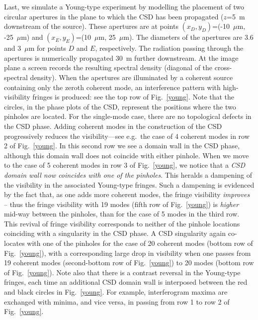 \documentclass[%
 reprint,
 amsmath,amssymb,
 aps,
]{revtex4-1}
\begin{document}
Last, we  simulate a Young-type experiment by modelling the placement of two circular apertures in the plane to which the CSD has been propagated ($z$=5~m downstream of the source). These apertures are at points $(x_D,y_D)$=(-10~$\mu$m, -25~$\mu$m) and  $(x_E,y_E)$=(10~$\mu$m, 25~$\mu$m). The diameters of the apertures are 3.6 and 3~$\mu$m for points $D$ and $E$, respectively. The radiation passing through the apertures is numerically propagated 30~m further downstream. At the image plane a screen records the resulting spectral density (diagonal of the cross-spectral density). When the apertures are illuminated by a coherent source containing only the zeroth coherent mode, an interference pattern with high-visibility fringes is produced: see the top row of Fig.~\ref{young}. Note that the circles, in the phase plots of the CSD, represent the positions where the two pinholes are located.  For the single-mode case, there are no topological defects in the CSD phase.  Adding coherent modes in the construction of the CSD progressively reduces the visibility---see e.g.~the case of 4 coherent modes in row 2 of Fig.~\ref{young}.  In this second row we see a domain wall in the CSD phase, although this domain wall does not coincide with either pinhole.  When we move to the case of 5 coherent modes in row 3 of Fig.~\ref{young}, we notice that a {\em CSD domain wall now coincides with one of the pinholes}.  This heralds a dampening of the visibility in the associated Young-type fringes.  Such a dampening is evidenced by the fact that, as one adds more coherent modes, the fringe visibility {\em improves} -- thus the fringe visibility with 19 modes (fifth row of Fig.~\ref{young}) is {\em higher} mid-way between the pinholes, than for the case of 5 modes in the third row.  This revival of fringe visibility corresponds to neither of the pinhole locations coinciding with a singularity in the CSD phase.  A CSD singularity again co-locates with one of the pinholes for the case of 20 coherent modes (bottom row of Fig.~\ref{young}), with a corresponding large drop in visibility when one passes from  19 coherent modes (second-bottom row of Fig.~\ref{young}) to 20 modes (bottom row of Fig.~\ref{young}).  Note also that there is a contrast reversal in the Young-type fringes, each time an additional CSD domain wall is interposed between the red and black circles in Fig.~\ref{young}.  For example, interferogram maxima are exchanged with minima, and vice versa, in passing from row 1 to row 2 of Fig.~\ref{young}.  
\end{document}
